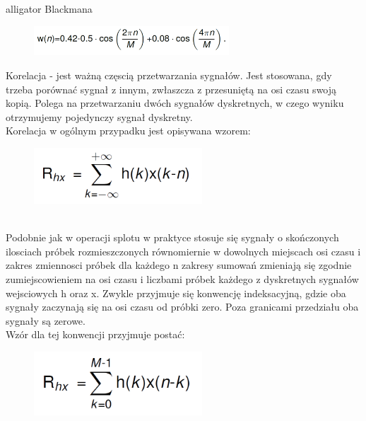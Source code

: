 \documentclass[12pt]{article}
\begin{document}
\begin{labeling}{alligator}
\subitem Blackmana

\begin{figure}[h!]
 \centering
 \includegraphics[width=7.3cm]{B.PNG}
 \vspace{-0.3cm}
 \label{gw}
\end{figure}


\item [Korelacja] - jest ważną częscią przetwarzania sygnałów. Jest stosowana, gdy trzeba porównać sygnał z innym, zwłaszcza z przesuniętą na osi czasu swoją kopią.
Polega na przetwarzaniu dwóch sygnałów dyskretnych, w czego wyniku otrzymujemy pojedynczy sygnał dyskretny.
\\Korelacja w ogólnym przypadku jest opisywana wzorem:
\begin{figure}[h!]
 \centering
 \includegraphics[width=6.3cm]{kor.PNG}
 \vspace{-0.3cm}
 \label{Widok_aplikacjis}
\end{figure}
\\Podobnie jak w operacji splotu w praktyce stosuje się sygnały o skończonych ilosciach próbek rozmieszczonych równomiernie w dowolnych miejscach osi czasu i zakres zmiennosci próbek dla każdego n zakresy sumowań zmieniają się zgodnie zumiejscowieniem na osi czasu i liczbami próbek każdego z dyskretnych sygnałów wejsciowych h oraz x. Zwykle przyjmuje się konwencję indeksacyjną, gdzie oba sygnały zaczynają się  na osi czasu od próbki zero. Poza granicami przedziału oba sygnały są zerowe. 
\\Wzór dla tej konwencji przyjmuje postać: 
\begin{figure}[h!]
 \centering
 \includegraphics[width=6.3cm]{korW.PNG}
 \vspace{-0.3cm}
 \label{Splot_indeks}
\end{figure}


\end{labeling}
\end{document}

